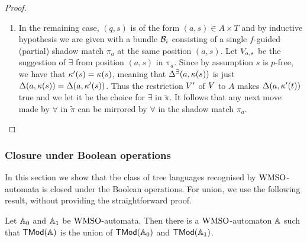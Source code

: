 \begin{proof}
\begin{enumerate}[label = (\Alph*), ref = \Alph*]
\begin{enumerate}[label = (\roman*), ref = \roman*]
  \end{enumerate}
  \item In the remaining case, $(q,s)$ is of the form $(a,s) \in A \times T$ and by inductive hypothesis we are given with a bundle $\mathcal{B}_i$ consisting of a single $f$-guided (partial) shadow match $\pi_a$ at the same position $(a,s)$. Let $V_{a,s}$ be the suggestion of $\exists$ from position $(a,s)$ in $\pi_a$. Since by assumption $s$ is $p$-free, we have that $\kappa'(s) = \kappa(s)$, meaning that $\Delta^\exists(a,\kappa(s))$ is just $\Delta(a,\kappa(s)) = \Delta(a,\kappa'(s))$. Thus the restriction $V'$ of $V$ to $A$ makes $\Delta(a,\kappa'(t))$ true and we let it be the choice for $\exists$ in $\tilde{\pi}$. It follows that any next move made by $\forall$ in $\tilde{\pi}$ can be mirrored by $\forall$ in the shadow match $\pi_a$.
      \begin{comment}Version with minimality:
      It follows that $\tmapProj(a,\tscolors(t))$ is just $\tmap(a,\tscolors(t)) = \tmap(a,\tscolors'(t))$ and the same valuation suggested by $f$ in $\pi_a$ is a legitimate choice for $\exists$ in $\tilde{\pi}$. By letting $\exists$ choose such valuation, it follows that any next move made by $\forall$ in $\tilde{\pi}$ can be mirrored by $\forall$ in the shadow match $\pi_a$.
      \end{comment}
\end{enumerate}
\end{proof}


\subsubsection{Closure under Boolean operations}

In this section we show that the class of tree languages recognised by $\mathrm{WMSO}$-automata is closed under the Boolean operations.
%
For union, we use the following result, without
providing the straightforward proof.

\begin{lemma}
\label{t:cl-dis}
Let $\mathbb{A}_{0}$ and $\mathbb{A}_{1}$ be $\mathrm{WMSO}$-automata.
Then there is a $\mathrm{WMSO}$-automaton $\mathbb{A}$ such that $\mathsf{TMod}(\mathbb{A})$ is the
union of $\mathsf{TMod}(\mathbb{A}_{0})$ and $\mathsf{TMod}(\mathbb{A}_{1})$.
\end{lemma}

